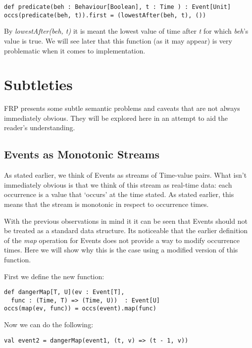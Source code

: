 \begin{verbatim}
def predicate(beh : Behaviour[Boolean], t : Time ) : Event[Unit]
occs(predicate(beh, t)).first = (lowestAfter(beh, t), ())
\end{verbatim}  

      By \emph{lowestAfter(beh, t)} it is meant the lowest value of time after \emph{t} for which 
      \emph{beh}'s value is true. We will see later that this function (as it may appear) is very problematic when
      it comes to implementation.
  
  \section{Subtleties}
    \label{sec:subtle}
    FRP presents some subtle semantic problems and caveats that are not always immediately obvious.
    They will be explored here in an attempt to aid the reader's understanding.
     
    \subsection{Events as Monotonic Streams}
      As stated earlier, we think of Events as streams of Time-value pairs. What isn't immediately
      obvious is that we think of this stream as real-time data: each occurrence is a value that
      `occurs' at the time stated. As stated earlier, this means that the stream is monotonic in
      respect to occurrence times.
      
      With the previous observations in mind it it can be seen that Events should not be treated as a
      standard data structure. Its noticeable that the earlier definition of the \emph{map} operation for
      Events does not provide a way to modify occurrence times. Here we will show why this is
      the case using a modified version of this function.
      
      First we define the new function:
      
\begin{verbatim}
def dangerMap[T, U](ev : Event[T], 
  func : (Time, T) => (Time, U))  : Event[U]
occs(map(ev, func)) = occs(event).map(func)
\end{verbatim}

      Now we can do the following:
      
\begin{verbatim}
val event2 = dangerMap(event1, (t, v) => (t - 1, v))
\end{verbatim}

